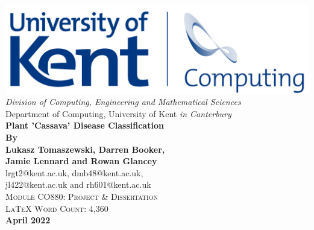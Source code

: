 \begin{titlepage}
\newcommand{\HRule}{\rule{\linewidth}{0.5mm}}
\begin{centering} 
\includegraphics[scale=0.95]{Media/MediaBin/uksc_logo.png} \\
\vspace{0.5cm} 
\large{\emph{Division of Computing, Engineering and Mathematical Sciences}} \\ [0.1cm]
\large{{Department of Computing, University of Kent \emph{in Canterbury}}} \\ [1.5cm]

\Huge{\bfseries{Plant 'Cassava' Disease Classification}} \\ [1.5cm]

\Large{\bfseries{By}}\\ [0.3cm]
{\Large{\bfseries{Lukasz Tomaszewski, Darren Booker, \\ Jamie Lennard and Rowan Glancey}}}\\[0.5cm]
{\Large{lrgt2@kent.ac.uk, dmb48@kent.ac.uk, \\ jl422@kent.ac.uk and rh601@kent.ac.uk}}\\[1.5cm]

\textsc{\Large Module CO880: Project \& Dissertation}\\ [0.2cm]
\textsc{\Large LaTeX Word Count: 4,360}\\ [1.5cm]

\textbf{\Large{April 2022}}\\
\end{centering} 
\end{titlepage}

